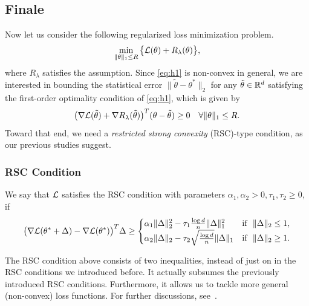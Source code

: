 \subsection{Finale}

Now let us consider the following regularized loss minimization problem.
\begin{equation}\label{eq:h1}
    \min_{\|\theta\|_1\le R}\big\{\mathcal{L}(\theta)+R_\lambda(\theta)\big\},
\end{equation}
where $R_\lambda$ satisfies the assumption.
Since \eqref{eq:h1} is non-convex in general,
we are interested in bounding the statistical error $\|\tilde\theta-\theta^*\|_2$
for any $\tilde\theta\in{\mathbb{R}}^d$ satisfying the first-order optimality condition
of \eqref{eq:h1},
which is given by
\begin{equation}
    \big(\nabla\mathcal{L}(\tilde\theta)+\nabla R_\lambda(\tilde\theta)\big)^T(\theta-\tilde\theta)
        \ge0\quad\forall\|\theta\|_1\le R.
\end{equation}
Toward that end,
we need a \emph{restricted strong convexity} (RSC)-type condition,
as our previous studies suggest.

\subsubsection{RSC Condition}

\begin{define}
We say that $\mathcal{L}$ satisfies the RSC condition with parameters
$\alpha_1,\alpha_2>0,\tau_1,\tau_2\ge0$, if
\begin{equation}
    \big(\nabla\mathcal{L}(\theta^*+\Delta)-\nabla\mathcal{L}(\theta^*)\big)^T\Delta\ge
    \begin{cases}
        \alpha_1\|\Delta\|_2^2-\tau_1\frac{\log d}{n}\|\Delta\|_1^2 &\text{if }~\|\Delta\|_2\le1,\\
        \alpha_2\|\Delta\|_2-\tau_2\sqrt{\frac{\log d}{n}}\|\Delta\|_1 &\text{if }~\|\Delta\|_2\ge1.\\
    \end{cases}
\end{equation}
\end{define}

The RSC condition above consists of two inequalities,
instead of just on in the RSC conditions we introduced before.
It actually subsumes the previously introduced RSC conditions.
Furthermore,
it allows us to tackle more general (non-convex) loss functions.
For further discussions,
see~\cite{loh2015regularized}.

